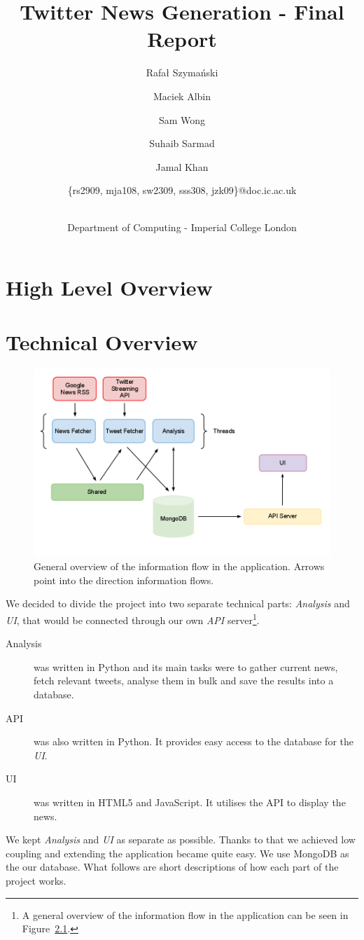 \documentclass{report}
\title{Twitter News Generation - Final Report}
\author{
    \small{Rafał Szymański}\\
  	\and
    \small{Maciek Albin}\\
    \and
    \small{Sam Wong}\\
    \and  
    \small{Suhaib Sarmad}\\
		\and
		\small{Jamal Khan}\\
		\and
		\small{\{rs2909, mja108, sw2309, sss308, jzk09\}@doc.ic.ac.uk}
		\and
		\\Department of Computing - Imperial College London
}
\begin{document}
 
	\maketitle
	\tableofcontents
	\newpage

	\chapter{High Level Overview}
	
	\chapter{Technical Overview}
	\begin{figure}
	 \includegraphics[scale=0.4]{infrastructure.png}
	 \caption{\label{fig:inf_flow} General overview of the information flow in the application. Arrows point into the direction information flows.}
	\end{figure}
	We decided to divide the project into two separate technical parts: \emph{Analysis} and \emph{UI}, that would be connected through our own \emph{API} server\footnote{A general overview of the information flow in the application can be seen in Figure~\ref{fig:inf_flow}.}.
	\begin{description}
	 \item[Analysis] was written in Python and its main tasks were to gather current news, fetch relevant tweets, analyse them in bulk and save the results into a database.
	 \item[API] was also written in Python. It provides easy access to the database for the \emph{UI}.
	 \item[UI] was written in HTML5 and JavaScript. It utilises the API to display the news.
	\end{description}	
	We kept \emph{Analysis} and \emph{UI} as separate as possible. Thanks to that we achieved low coupling and extending the application became quite easy. We use MongoDB as the our database. What follows are short descriptions of how each part of the project works.
	
\end{document}
